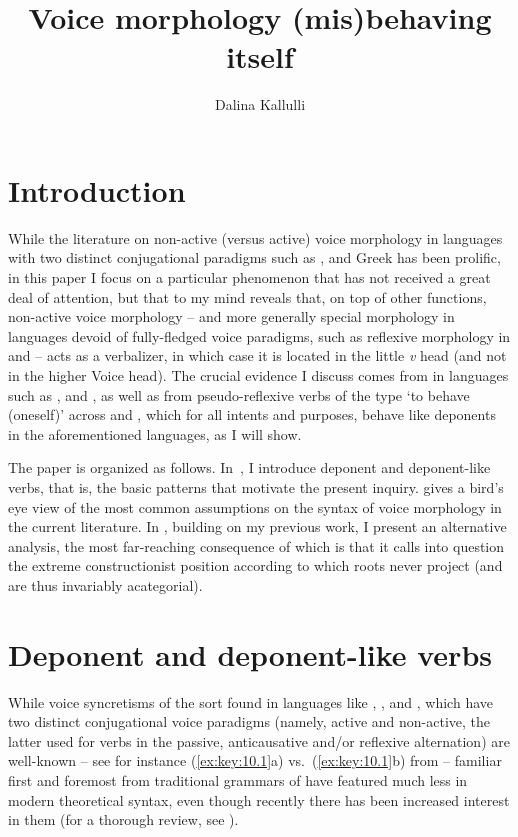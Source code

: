 \documentclass[output=paper]{langsci/langscibook}
\author{Dalina Kallulli\affiliation{University of Vienna}}
\title{Voice morphology (mis)behaving itself}
\begin{document}
\glsresetall

\section{Introduction}\label{sec:key:10.1}

While the literature on non-active (versus active) voice morphology in
languages with two distinct conjugational paradigms such as ,  and
Greek has been prolific, in this paper I focus on a particular phenomenon that
has not received a great deal of attention, but that to my mind reveals that,
on top of other functions, non-active voice morphology – and more generally
special morphology in languages devoid of fully-fledged voice paradigms, such
as reflexive morphology in  and  – acts as a verbalizer, in
which case it is located in the little \emph{v} head (and not in the higher
Voice head). The crucial evidence I discuss comes from  in
languages such as ,  and , as well as from pseudo-reflexive
verbs of the type ‘to behave (oneself)’ across  and , which for
all intents and purposes, behave like deponents in the aforementioned
languages, as I will show.

The paper is organized as follows. In~, I introduce deponent
and deponent-like verbs, that is, the basic patterns that motivate the present
inquiry.  gives a bird’s eye view of the most common
assumptions on the syntax of voice morphology in the current literature. In
, building on my previous work, I present an alternative
analysis, the most far-reaching consequence of which is that it calls into
question the extreme constructionist position according to which roots never
project (and are thus invariably acategorial).

\section{Deponent and deponent-like verbs}\label{sec:key:10.2}

While voice syncretisms of the sort found in languages like , ,
and , which have two distinct conjugational voice paradigms (namely,
active and non-active, the latter used for verbs in the passive, anticausative
and/or reflexive alternation) are well-known – see for instance (\ref{ex:key:10.1}a)
vs.\ (\ref{ex:key:10.1}b) from  –  familiar first and foremost
from traditional grammars of  have featured much less in modern
theoretical syntax, even though recently there has been increased interest in
them (for a thorough review, see \citealt{Grestenberger2014}).
\end{document}
